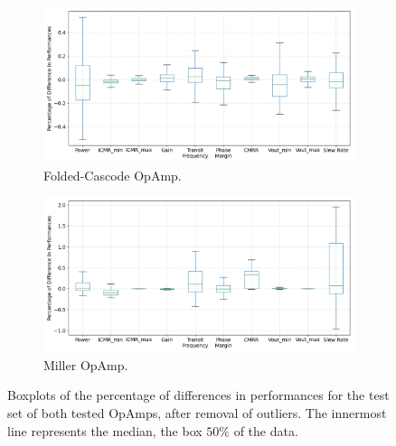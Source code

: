 \documentclass[conference]{IEEEtran}
\begin{document}
	\begin{figure}[]
		\begin{subfigure}{.5\textwidth}
			\centering
			\includegraphics[width=\linewidth]{figures/BoxplotFCA}
			\setlength{\abovecaptionskip}{0ex}%
			\setlength{\belowcaptionskip}{0ex}%
			\caption{Folded-Cascode OpAmp.}
			\label{fig:boxplotfca}
		\end{subfigure}
		\hfill
		\begin{subfigure}{.5\textwidth}
			\centering
			\includegraphics[width=\linewidth]{figures/BoxplotMillerOpAmp}
			\setlength{\abovecaptionskip}{-0.5ex}%
			\caption{Miller OpAmp.}
			\label{fig:boxplotmiller}
		\end{subfigure}
		\setlength{\abovecaptionskip}{3ex}%
		\setlength{\belowcaptionskip}{-3ex}%
		\caption{Boxplots of the percentage of differences in performances for the test set of both tested OpAmps, after removal of outliers. The innermost line represents the median, the box $50\%$ of the data. }
		\label{fig:boxplots}
	\end{figure}
	
\end{document}
